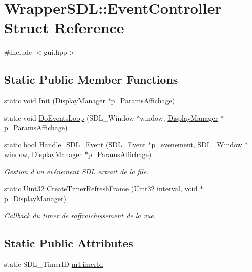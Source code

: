 \hypertarget{struct_wrapper_s_d_l_1_1_event_controller}{\section{Wrapper\+S\+D\+L\+:\+:Event\+Controller Struct Reference}
\label{struct_wrapper_s_d_l_1_1_event_controller}
}


{\ttfamily \#include $<$gui.\+hpp$>$}

\subsection*{Static Public Member Functions}
\begin{DoxyCompactItemize}
\item 
static void \hyperlink{struct_wrapper_s_d_l_1_1_event_controller_a1d120644a13d32238f3372b601a67f80}{Init} (\hyperlink{class_display_manager}{Display\+Manager} $\ast$p\+\_\+\+Params\+Affichage)
\item 
static void \hyperlink{struct_wrapper_s_d_l_1_1_event_controller_a04b13cf306ca88f74c92efb91f4586a3}{Do\+Events\+Loop} (S\+D\+L\+\_\+\+Window $\ast$window, \hyperlink{class_display_manager}{Display\+Manager} $\ast$p\+\_\+\+Params\+Affichage)
\item 
static bool \hyperlink{struct_wrapper_s_d_l_1_1_event_controller_a07cffdf5cf9e8ed68e645239602819d4}{Handle\+\_\+\+S\+D\+L\+\_\+\+Event} (S\+D\+L\+\_\+\+Event $\ast$p\+\_\+evenement, S\+D\+L\+\_\+\+Window $\ast$window, \hyperlink{class_display_manager}{Display\+Manager} $\ast$p\+\_\+\+Params\+Affichage)
\begin{DoxyCompactList}\small\item\em Gestion d'un événement S\+D\+L extrait de la file. \end{DoxyCompactList}\item 
static Uint32 \hyperlink{struct_wrapper_s_d_l_1_1_event_controller_ad4516dc1813e1ab583659ae8386b84af}{Create\+Timer\+Refresh\+Frame} (Uint32 interval, void $\ast$p\+\_\+\+Display\+Manager)
\begin{DoxyCompactList}\small\item\em Callback du timer de raffraichissement de la vue. \end{DoxyCompactList}\end{DoxyCompactItemize}
\subsection*{Static Public Attributes}
\begin{DoxyCompactItemize}
\item 
static S\+D\+L\+\_\+\+Timer\+I\+D \hyperlink{struct_wrapper_s_d_l_1_1_event_controller_a9d7e9e2326802d622fc1bd9e5a22677b}{m\+Timer\+Id}
\end{DoxyCompactItemize}


